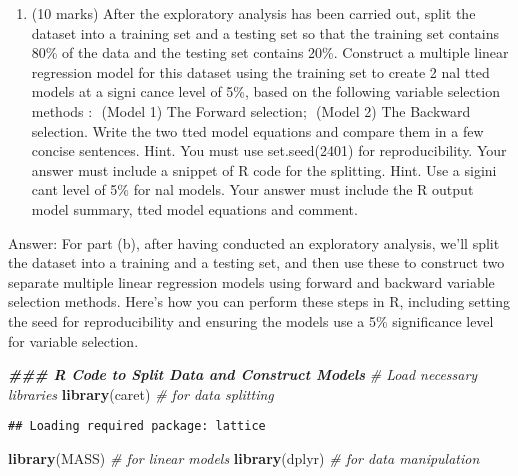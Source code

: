 \documentclass[
]{article}
\newenvironment{Shaded}{\begin{snugshade}}{\end{snugshade}}
\newcommand{\CommentTok}[1]{\textcolor[rgb]{0.56,0.35,0.01}{\textit{#1}}}
\newcommand{\DocumentationTok}[1]{\textcolor[rgb]{0.56,0.35,0.01}{\textbf{\textit{#1}}}}
\newcommand{\FunctionTok}[1]{\textcolor[rgb]{0.13,0.29,0.53}{\textbf{#1}}}
\newcommand{\NormalTok}[1]{#1}
\providecommand{\tightlist}{%
  \setlength{\itemsep}{0pt}\setlength{\parskip}{0pt}}
\begin{document}
\begin{enumerate}
\def\labelenumi{(\alph{enumi})}
\setcounter{enumi}{1}
\tightlist
\item
  (10 marks) After the exploratory analysis has been carried out, split
  the dataset into a training set and a testing set so that the training
  set contains 80\% of the data and the testing set contains 20\%.
  Construct a multiple linear regression model for this dataset using
  the training set to create 2 nal tted models at a signi cance level of
  5\%, based on the following variable selection methods :  (Model 1)
  The Forward selection;  (Model 2) The Backward selection. Write the
  two tted model equations and compare them in a few concise sentences.
  Hint. You must use set.seed(2401) for reproducibility. Your answer
  must include a snippet of R code for the splitting. Hint. Use a sigini
  cant level of 5\% for nal models. Your answer must include the R
  output model summary, tted model equations and comment.
\end{enumerate}

Answer: For part (b), after having conducted an exploratory analysis,
we'll split the dataset into a training and a testing set, and then use
these to construct two separate multiple linear regression models using
forward and backward variable selection methods. Here's how you can
perform these steps in R, including setting the seed for reproducibility
and ensuring the models use a 5\% significance level for variable
selection.

\begin{Shaded}
\begin{Highlighting}[]
\DocumentationTok{\#\#\# R Code to Split Data and Construct Models}
\CommentTok{\# Load necessary libraries}
\FunctionTok{library}\NormalTok{(caret)   }\CommentTok{\# for data splitting}
\end{Highlighting}
\end{Shaded}

\begin{verbatim}
## Loading required package: lattice
\end{verbatim}

\begin{Shaded}
\begin{Highlighting}[]
\FunctionTok{library}\NormalTok{(MASS)    }\CommentTok{\# for linear models}
\FunctionTok{library}\NormalTok{(dplyr)   }\CommentTok{\# for data manipulation}
\end{Highlighting}
\end{Shaded}
\end{document}
